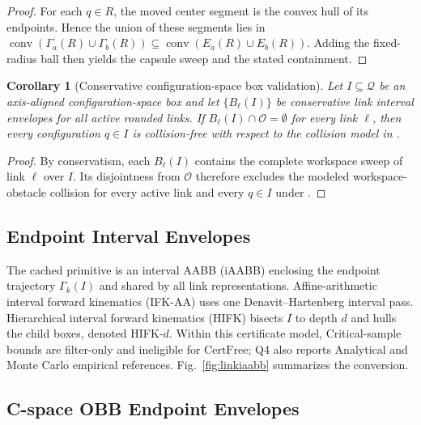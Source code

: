 \documentclass[journal]{IEEEtran}
\newtheorem{corollary}{Corollary}
\newcommand{\calO}{\ensuremath{\mathcal{O}}}
\newcommand{\Q}{\ensuremath{\mathcal{Q}}}
\begin{document}
\begin{proof}
For each $q\in R$, the moved center segment is the convex hull of its endpoints.
Hence the union of these segments lies in
\(\operatorname{conv}(\Gamma_a(R)\cup\Gamma_b(R))\subseteq
\operatorname{conv}(E_a(R)\cup E_b(R))\). Adding the fixed-radius ball then
yields the capsule sweep and the stated containment.
\end{proof}

\begin{corollary}[Conservative configuration-space box validation]
\label{cor:box_validation}
Let $I\subseteq\Q$ be an axis-aligned configuration-space box and let
$\{B_\ell(I)\}$ be conservative link interval envelopes for all active rounded links. If
$B_\ell(I)\cap\calO=\emptyset$ for every link $\ell$, then every configuration
$q\in I$ is collision-free with respect to the collision model in
.
\end{corollary}

\begin{proof}
By conservatism, each $B_\ell(I)$ contains the complete workspace sweep of link
$\ell$ over $I$. Its disjointness from $\calO$ therefore excludes the modeled
workspace-obstacle collision for every active link and every $q\in I$ under
.
\end{proof}

\subsection{Endpoint Interval Envelopes}\label{sec:rewrite_endpoint_env}

The cached primitive is an interval AABB (iAABB) enclosing the endpoint
trajectory $\Gamma_k(I)$ and shared by all link representations.
Affine-arithmetic interval forward kinematics (IFK-AA) uses one
Denavit--Hartenberg interval pass. Hierarchical interval forward kinematics
(HIFK) bisects $I$ to depth $d$ and hulls the child boxes, denoted HIFK-$d$.
Within this certificate model, Critical-sample bounds are filter-only and
ineligible for $\mathrm{CertFree}$; Q4 also reports Analytical and Monte Carlo
empirical references.
Fig.~\ref{fig:linkiaabb} summarizes the conversion.

\subsection{C-space OBB Endpoint Envelopes}\label{sec:obb_endpoint_env}
\end{document}
